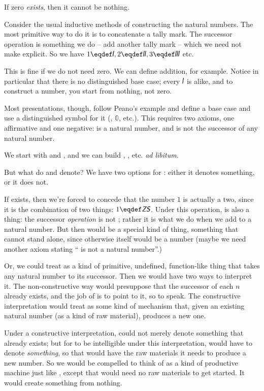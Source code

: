 \documentclass{article}
\begin{document}
If zero \textit{exists}, then it cannot be nothing.

Consider the usual inductive methods of constructing the natural
numbers. The most primitive way to do it is to concatenate a tally
mark. The successor operation is something we do -- add another tally
mark -- which we need not make explicit. So we have \(1\eqdef\Stroke{1},
2\eqdef\Stroke{2}, 3\eqdef\Stroke{3}\) etc.

This is fine if we do not need zero. We can define addition, for
example. Notice in particular that there is no distinguished base
case; every \(\Stroke{1}\) is alike, and to construct a number, you
start from nothing, not zero.

Most presentations, though, follow Peano's example and define a base
case and use a distinguished symbol for it (\Znat, \(\mathbb{0}\),
etc.). This requires two axioms, one affirmative and one negative:
\Znat{} is a natural number, and \Znat{} is not the successor of any
natural number.

We start with \Znat{} and \Snat{}, and we can build \ZS, \ZSS, etc.
\textit{ad libitum}.

But what do \Znat{} and \Snat{} denote? We have two options for \Znat:
either it denotes something, or it does not.

If \Znat{} exists, then we're forced to concede that the number \(1\)
is actually a two, since it is the combination of two things:
\(1\eqdef \ZS\). Under this operation, \Snat{} is also a thing:
the successor \textit{operation} is not \Snat; rather it is what we do
when we add \Snat{} to a natural number. But then \Snat{} would be a
special kind of thing, something that cannot stand alone, since
otherwise \Snat{} itself would be a number (maybe we need another
axiom stating ``\Snat{} is not a natural number''.)

Or, we could treat \Snat{} as a kind of primitive, undefined,
function-like thing that takes any natural number to its successor.
Then we would have two ways to interpret it. The non-constructive way
would presuppose that the successor of each \(n\) already exists, and
the job of \Snat{} is to point to it, so to speak. The constructive
interpretation would treat \Snat{} as some kind of mechanism that, given
an existing natural number (as a kind of raw material), produces a new
one.

Under a constructive interpretation, \Znat{} could not merely denote
something that already exists; but for \ZS{} to be intelligible
under this interpretation, \Znat{} would have to denote
\textit{something}, so that \Snat{} would have the raw materials it
needs to produce a new number. So we would be compelled to think of
\Znat{} as a kind of productive machine just like \Snat, except that
\Znat{} would need no raw materials to get started. It would create
something from nothing.
\end{document}
